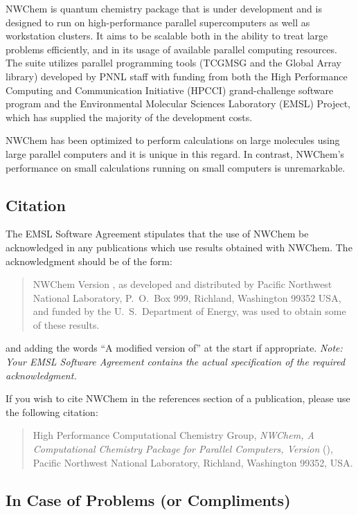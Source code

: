 
NWChem is quantum chemistry package that is under development and is
designed to run on high-performance parallel supercomputers as well as
workstation clusters.  It aims to be scalable both in the ability to
treat large problems efficiently, and in its usage of available
parallel computing resources.  The suite utilizes parallel programming
tools (TCGMSG and the Global Array library) developed by PNNL staff
with funding from both the High Performance Computing and
Communication Initiative (HPCCI) grand-challenge software program and
the Environmental Molecular Sciences Laboratory (EMSL) Project, which
has supplied the majority of the development costs.

NWChem has been optimized to perform calculations on large molecules
using large parallel computers and it is unique in this regard.  In
contrast, NWChem's performance on small calculations running on
small computers is unremarkable.

\subsection{Citation}

The EMSL Software Agreement stipulates that the use of NWChem be
acknowledged in any publications which use results obtained with
NWChem.  The acknowledgment should be of the form:
\begin{quote}
  NWChem Version \nwchemversion, as developed and distributed by
  Pacific Northwest National Laboratory, P.~O.~Box 999, Richland,
  Washington 99352 USA, and funded by the U.~S.~Department of Energy,
  was used to obtain some of these results.
\end{quote}
and adding the words ``A modified version of'' at the start
if appropriate.  {\em Note: Your EMSL Software Agreement contains the
actual specification of the required acknowledgment.}

If you wish to cite NWChem in the references section of a publication,
please use the following citation:
\begin{quote}
  High Performance Computational Chemistry Group, {\em NWChem, A
    Computational Chemistry Package for Parallel Computers, Version
    \nwchemversion{}} (\nwchemyear), Pacific Northwest National
  Laboratory, Richland, Washington 99352, USA.
\end{quote}

\subsection{In Case of Problems (or Compliments)}


